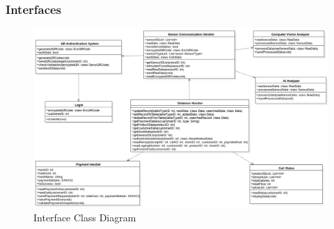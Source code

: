 \documentclass[11pt]{article}
\begin{document}
    \subsubsection{Interfaces}
    \begin{center}
        \begin{figure}[H]
            \includegraphics[width=\linewidth]{Images/InterfaceClassDiagram.png}
            \caption{Interface Class Diagram}
            \label{icd}
        \end{figure}
    \end{center}
\end{document}
